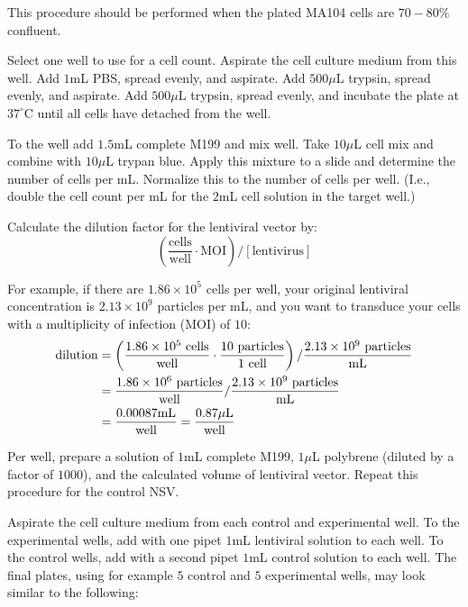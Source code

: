 This procedure should be performed when the plated MA104 cells are $70-80\%$ confluent.

Select one well to use for a cell count. Aspirate the cell culture medium from this well. Add $1$mL PBS, spread evenly, and aspirate. Add $500\mu$L trypsin, spread evenly, and aspirate. Add $500\mu$L trypsin, spread evenly, and incubate the plate at $37^{\circ}$C until all cells have detached from the well.

To the well add $1.5$mL complete M199 and mix well. Take $10\mu$L cell mix and combine with $10\mu$L trypan blue. Apply this mixture to a slide and determine the number of cells per mL. Normalize this to the number of cells per well. (I.e., double the cell count per mL for the $2$mL cell solution in the target well.)

Calculate the dilution factor for the lentiviral vector by:
\begin{equation*}
\left(\frac{\text{cells}}{\text{well}}\cdot \text{MOI}\right)/\left[\text{lentivirus}\right]
\end{equation*}

For example, if there are $1.86\times 10^5$ cells per well, your original lentiviral concentration is $2.13\times 10^9$ particles per mL, and you want to transduce your cells with a multiplicity of infection (MOI) of $10$:
\begin{align*}
\text{dilution} &= \left(\frac{1.86\times 10^{5}\text{ cells}}{\text{well}}\cdot \frac{10\text{ particles}}{1\text{ cell}}\right)/\frac{2.13\times 10^{9}\text{ particles}}{\text{mL}} \\
&= \frac{1.86\times 10^{6}\text{ particles}}{\text{well}}/\frac{2.13\times 10^{9}\text{ particles}}{\text{mL}} \\
&= \frac{0.00087\text{mL}}{\text{well}} = \frac{0.87\mu\text{L}}{\text{well}}
\end{align*}

Per well, prepare a solution of $1$mL complete M199, $1\mu$L polybrene (diluted by a factor of $1000$), and the calculated volume of lentiviral vector. Repeat this procedure for the control NSV.

Aspirate the cell culture medium from each control and experimental well. To the experimental wells, add with one pipet $1$mL lentiviral solution to each well. To the control wells, add with a second pipet $1$mL control solution to each well. The final plates, using for example $5$ control and $5$ experimental wells, may look similar to the following:

